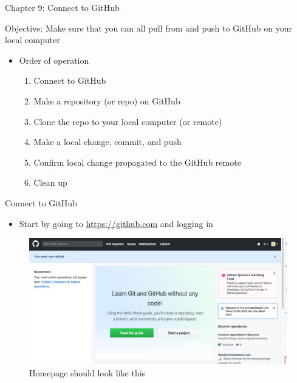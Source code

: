 \documentclass[
  ignorenonframetext,
]{beamer}
\providecommand{\tightlist}{%
  \setlength{\itemsep}{0pt}\setlength{\parskip}{0pt}}
\begin{document}
\begin{frame}{Chapter 9: Connect to GitHub}
\protect\hypertarget{chapter-9-connect-to-github}{}

Objective: Make sure that you can all pull from and push to GitHub on
your local computer

\begin{itemize}
\tightlist
\item
  Order of operation

  \begin{enumerate}
  \tightlist
  \item
    Connect to GitHub
  \item
    Make a repository (or repo) on GitHub
  \item
    Clone the repo to your local computer (or remote)
  \item
    Make a local change, commit, and push
  \item
    Confirm local change propagated to the GitHub remote
  \item
    Clean up
  \end{enumerate}
\end{itemize}

\end{frame}

\begin{frame}{Connect to GitHub}
\protect\hypertarget{connect-to-github}{}

\begin{itemize}
\tightlist
\item
  Start by going to \url{https://github.com} and logging in
\end{itemize}

\begin{figure}
\centering
\includegraphics{pres_figs/homepage.png}
\caption{Homepage should look like this}
\end{figure}

\end{frame}
\end{document}
